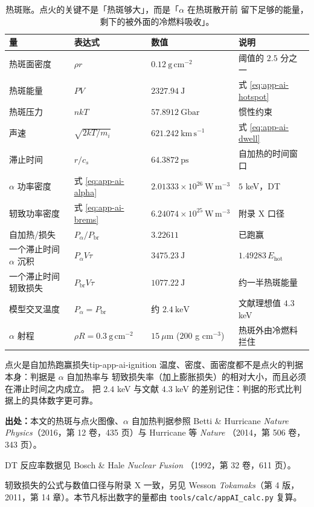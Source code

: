 \begin{table}[htbp]
\centering
\small
\caption{热斑账。点火的关键不是「热斑够大」，而是「$\alpha$ 在热斑散开前
留下足够的能量，剩下的被外面的冷燃料吸收」。}
\label{tab:app-ai-ignition}
\begin{tabular}{p{4.0cm}p{3.0cm}p{3.0cm}p{3.0cm}}
\toprule
量 & 表达式 & 数值 & 说明 \\
\midrule
热斑面密度 & $\rho r$ & $0.12\ \mathrm{g\,cm^{-2}}$ & 阈值的 $2.5$ 分之一 \\
热斑能量 & $P V$ & $2327.94\ \mathrm{J}$ & 式 \eqref{eq:app-ai-hotspot} \\
热斑压力 & $n k T$ & $57.8912\ \mathrm{Gbar}$ & 惯性约束 \\
声速 & $\sqrt{2kT/m_i}$ & $621.242\ \mathrm{km\,s^{-1}}$ & 式 \eqref{eq:app-ai-dwell} \\
滞止时间 & $r/c_s$ & $64.3872\ \mathrm{ps}$ & 自加热的时间窗口 \\
$\alpha$ 功率密度 & 式 \eqref{eq:app-ai-alpha} & $2.01333\times10^{26}\ \mathrm{W\,m^{-3}}$ & $5$ keV，DT \\
轫致功率密度 & 式 \eqref{eq:app-ai-brems} & $6.24074\times10^{25}\ \mathrm{W\,m^{-3}}$ & 附录 X 口径 \\
自加热/损失 & $P_\alpha/P_{\mathrm{br}}$ & $3.22611$ & 已跑赢 \\
一个滞止时间 $\alpha$ 沉积 & $P_\alpha V \tau$ & $3475.23\ \mathrm{J}$ & $1.49283\,E_{\mathrm{hot}}$ \\
一个滞止时间轫致损失 & $P_{\mathrm{br}} V \tau$ & $1077.22\ \mathrm{J}$ & 约一半热斑能量 \\
模型交叉温度 & $P_\alpha = P_{\mathrm{br}}$ & 约 $2.4\ \mathrm{keV}$ & 文献理想值 $4.3$ keV \\
$\alpha$ 射程 & $\rho R = 0.3\ \mathrm{g\,cm^{-2}}$ & $15\ \mu$m ($200$ g cm$^{-3}$) & 热斑外由冷燃料拦住 \\
\bottomrule
\end{tabular}

\end{table}

\begin{tip}{点火是自加热跑赢损失}{tip-app-ai-ignition}
温度、密度、面密度都不是点火的判据本身：判据是 $\alpha$ 自加热率与
轫致损失率（加上膨胀损失）的相对大小，而且必须在滞止时间之内成立。
把 $2.4$ keV 与文献 $4.3$ keV 的差别记住：判据的形式比判据上的具体数字更可靠。
\end{tip}

{\footnotesize
\textbf{出处：}本文的热斑与点火图像、$\alpha$ 自加热判据参照 Betti \& Hurricane
\emph{Nature Physics}（2016，第 12 卷，435 页）与 Hurricane 等 \emph{Nature}
（2014，第 506 卷，343 页）。

DT 反应率数据见 Bosch \& Hale \emph{Nuclear Fusion}
（1992，第 32 卷，611 页）。

轫致损失的公式与数值口径与附录 X 一致，另见
Wesson \emph{Tokamaks}（第 4 版，2011，第 14 章）。本节凡标出数字的量都由
\texttt{tools/\allowbreak{}calc/\allowbreak{}appAI\_calc.py} 复算。
}

